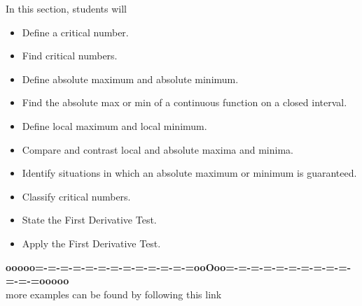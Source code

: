 \documentclass{ximera}
\begin{document}
\begin{sectionOutcomes}
In this section, students will 

\begin{itemize}
\item Define a critical number.
\item Find critical numbers.
\item Define absolute maximum and absolute minimum.
\item Find the absolute max or min of a continuous function on a closed interval.
\item Define local maximum and local minimum.
\item Compare and contrast local and absolute maxima and minima.
\item Identify situations in which an absolute maximum or minimum is guaranteed.
\item Classify critical numbers.
\item State the First Derivative Test.
\item Apply the First Derivative Test.
\end{itemize}
\end{sectionOutcomes}










\begin{center}
\textbf{\textcolor{green!50!black}{ooooo=-=-=-=-=-=-=-=-=-=-=-=-=ooOoo=-=-=-=-=-=-=-=-=-=-=-=-=ooooo}} \\

more examples can be found by following this link\\ 

\end{center}
\end{document}
